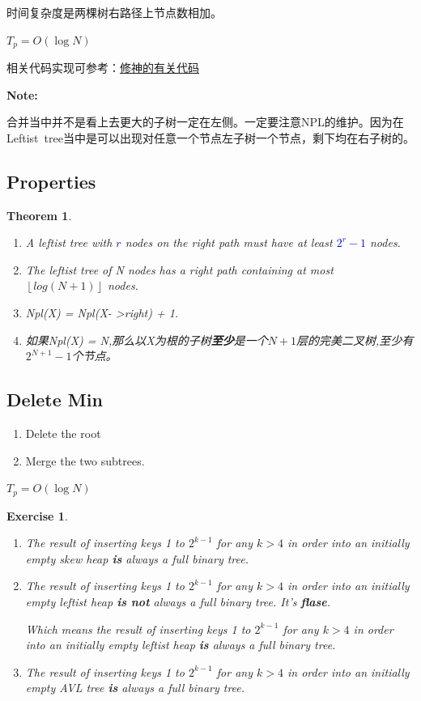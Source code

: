 \documentclass{article}
\newtheorem*{Theorem}{Theorem}
\newtheorem*{Exercise}{Exercise}
\begin{document}
时间复杂度是两棵树右路径上节点数相加。\par
$T_p=O(\log N)$\par
相关代码实现可参考：\href{https://note.isshikih.top/cour_note/D2CX_AdvancedDataStructure/Lec04/#%E6%91%8A%E8%BF%98%E5%88%86%E6%9E%90}{修神的有关代码}\par
\textbf{Note:}\par
合并当中并不是看上去更大的子树一定在左侧。一定要注意NPL的维护。因为在Leftist\ tree当中是可以出现对任意一个节点左子树一个节点，剩下均在右子树的。

\subsection{Properties}
\begin{Theorem}
    \begin{enumerate}
        \item A leftist tree with \textcolor{blue}{$r$} nodes on the right path must have at least \textcolor{blue}{$2^r-1$} nodes.
        \item The leftist tree of N nodes has a right path containing at most $\left \lfloor log(N+1) \right \rfloor$ nodes.
        \item Npl(X) = Npl(X- \textgreater right) + 1.
        \item 如果Npl(X) = N,那么以X为根的子树\textbf{至少}是一个$N+1$层的完美二叉树,至少有$2^{N+1}-1$个节点。
    \end{enumerate}
\end{Theorem}

\subsection{Delete Min}
\begin{enumerate}
    \item Delete the root
    \item Merge the two subtrees. 
\end{enumerate}

$T_p=O(\log N)$

\begin{Exercise}
    \begin{enumerate}
        \item The result of inserting keys 1 to $2^{k-1}$ for any $k>4$ in order into an initially empty skew heap \textbf{is} always a full binary tree.
        \item The result of inserting keys 1 to $2^{k-1}$ for any $k>4$ in order into an initially empty leftist heap \textbf{is not} always a full binary tree. It's \textbf{flase}. \par
        Which means the result of inserting keys 1 to $2^{k-1}$ for any $k>4$ in order into an initially empty leftist heap \textbf{is} always a full binary tree.
        \item The result of inserting keys 1 to $2^{k-1}$ for any $k>4$ in order into an initially empty AVL tree \textbf{is} always a full binary tree.
    \end{enumerate}
\end{Exercise}
\end{document}
